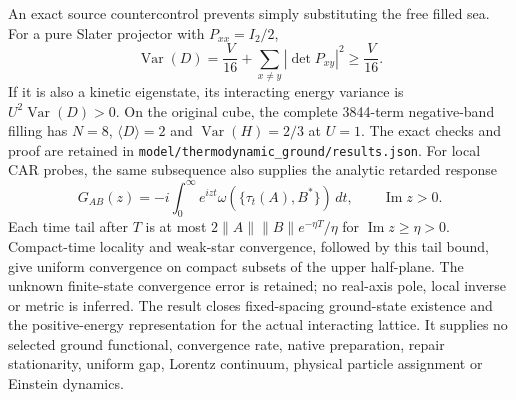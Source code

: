 An exact source countercontrol prevents simply substituting the free
filled sea.  For a pure Slater projector with $P_{xx}=I_2/2$,
\[
 \operatorname{Var}(D)
   =\frac V{16}+\sum_{x\ne y}|\det P_{xy}|^2\ge\frac V{16}.
\]
If it is also a kinetic eigenstate, its interacting energy variance is
$U^2\operatorname{Var}(D)>0$.  On the original cube, the complete
3844-term negative-band filling has $N=8$, $\langle D\rangle=2$ and
$\operatorname{Var}(H)=2/3$ at $U=1$.  The exact checks and proof are
retained in \texttt{model/thermodynamic\_ground/results.json}.
For local CAR probes, the same subsequence also supplies the analytic
retarded response
\[
 G_{AB}(z)=-i\int_0^\infty e^{izt}
       \omega(\{\tau_t(A),B^*\})\,dt,\qquad \operatorname{Im}z>0.
\]
Each time tail after $T$ is at most
$2\|A\|\|B\|e^{-\eta T}/\eta$ for $\operatorname{Im}z\ge\eta>0$.
Compact-time locality and weak-star convergence, followed by this tail
bound, give uniform convergence on compact subsets of the upper
half-plane.  The unknown finite-state convergence error is retained;
no real-axis pole, local inverse or metric is inferred.
The result closes fixed-spacing ground-state existence and the
positive-energy representation for the actual interacting lattice.
It supplies no selected ground functional, convergence rate, native
preparation, repair stationarity, uniform gap, Lorentz continuum,
physical particle assignment or Einstein dynamics.
